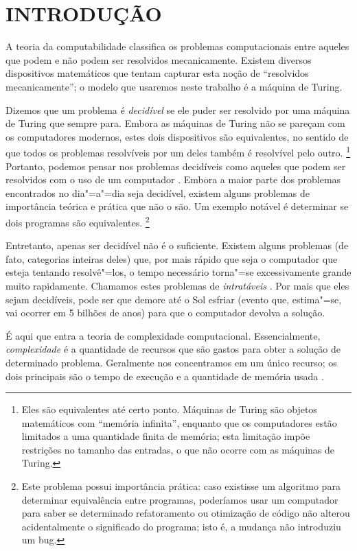 \chapter{INTRODUÇÃO}

A teoria da computabilidade
classifica os problemas computacionais entre
aqueles que podem e não podem ser resolvidos mecanicamente.
Existem diversos dispositivos matemáticos
que tentam capturar esta noção de
``resolvidos mecanicamente'';
o modelo que usaremos neste trabalho é a máquina de Turing.

Dizemos que um problema é \emph{decidível}
se ele puder ser resolvido por uma máquina de Turing que sempre para.
Embora as máquinas de Turing
não se pareçam com os computadores modernos,
estes dois dispositivos são equivalentes,
no sentido de que
todos os problemas resolvíveis por um deles
também é resolvível pelo outro.%
\footnote{
    Eles são equivalentes até certo ponto.
    Máquinas de Turing são objetos matemáticos
    com ``memória infinita'',
    enquanto que os computadores estão limitados
    a uma quantidade finita de memória;
    esta limitação impõe restrições no tamanho das entradas,
    o que não ocorre com as máquinas de Turing.
}
Portanto, podemos pensar nos problemas decidíveis
como aqueles que podem ser resolvidos com o uso de um computador
\cite[p.~307]{HopcroftMotwaniUllman2001}.
Embora a maior parte dos problemas
encontrados no dia"=a"=dia seja decidível,
existem alguns problemas de importância teórica e prática
que não o são.
Um exemplo notável é determinar se dois programas são equivalentes.%
\footnote{
    Este problema possui importância prática:
    caso existisse um algoritmo para determinar equivalência entre programas,
    poderíamos usar um computador para saber se
    determinado refatoramento ou otimização de código
    não alterou acidentalmente o significado do programa;
    isto é, a mudança não introduziu um bug.
}

Entretanto,
apenas ser decidível não é o suficiente.
Existem alguns problemas
(de fato, categorias inteiras deles)
que, por mais rápido que seja o computador
que esteja tentando resolvê"=los,
o tempo necessário torna"=se excessivamente grande
muito rapidamente.
Chamamos estes problemas de \emph{intratáveis}
\cite[p.~1]{HopcroftMotwaniUllman2001}.
Por mais que eles sejam decidíveis,
pode ser que demore até o Sol esfriar
(evento que, estima"=se, vai ocorrer em 5 bilhões de anos)
para que o computador devolva a solução.

É aqui que entra a teoria de complexidade computacional.
Essencialmente,
\emph{complexidade}
é a quantidade de recursos que são gastos
para obter a solução de determinado problema.
Geralmente nos concentramos em um único recurso;
os dois principais são o tempo de execução e a quantidade de memória usada
\cite[p.~285]{HopcroftUllman1979}.

